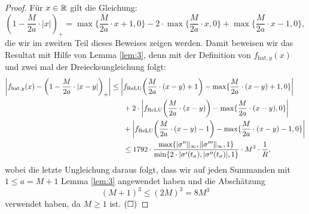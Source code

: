   \begin{proof}
  Für $x \in \mathbb{R}$ gilt die Gleichung:
\begin{equation}
\label{lem:4:eq}
 (1 - \frac{M}{2a} \cdot |x|)_+ = \max\{\frac{M}{2a} \cdot x + 1, 0\} - 2 \cdot \max\{\frac{M}{2a} \cdot x, 0\} + \max\{\frac{M}{2a} \cdot x - 1, 0\}, 
 \end{equation}  
die wir im zweiten Teil dieses Beweises zeigen werden. Damit beweisen wir das Resultat mit Hilfe von Lemma \ref{lem:3}, denn mit der Definition von $f_{\mathrm{hat},y}(x)$ und zwei mal der Dreiecksungleichung folgt:
\begin{equation*}
\begin{split}
\bigg|f_{\mathrm{hat},y}(x) - \bigg(1 - \frac{M}{2a} \cdot |x - y|\bigg)_+\bigg| \leq \bigg|&f_{\mathrm{ReLU}} \bigg(\frac{M}{2a} \cdot (x - y) + 1\bigg) - \max\{\frac{M}{2a} \cdot (x - y) + 1, 0\}\bigg| \\ 
& + 2 \cdot \bigg|f_{\mathrm{ReLU}}\bigg(\frac{M}{2a} \cdot (x - y)\bigg) - \max\{\frac{M}{2a} \cdot (x - y), 0\}\bigg| \\
& + \bigg|f_{\mathrm{ReLU}}\bigg(\frac{M}{2a} \cdot (x - y) - 1\bigg) - \max\{\frac{M}{2a} \cdot (x - y) - 1, 0\}\bigg|\\ 
& \leq 1792 \cdot \frac{\max\{|\sigma''\|_{\infty}, \|\sigma'''\|_{\infty}, 1\}}{\min\{2 \cdot |\sigma'(t_{\sigma}), |\sigma''(t_{\sigma})|, 1\}} \cdot M^3 \cdot \frac{1}{R},
\end{split}
\end{equation*} 
wobei die letzte Ungleichung daraus folgt, dass wir auf jeden Summanden mit $1 \leq a = M + 1$ Lemma \ref{lem:3} angewendet haben und die Abschätzung 
$$ (M + 1)^3 \leq (2M)^3 = 8M^3$$ verwendet haben, da $M \geq 1$ ist. $\hfill(\square)$


\end{proof}
